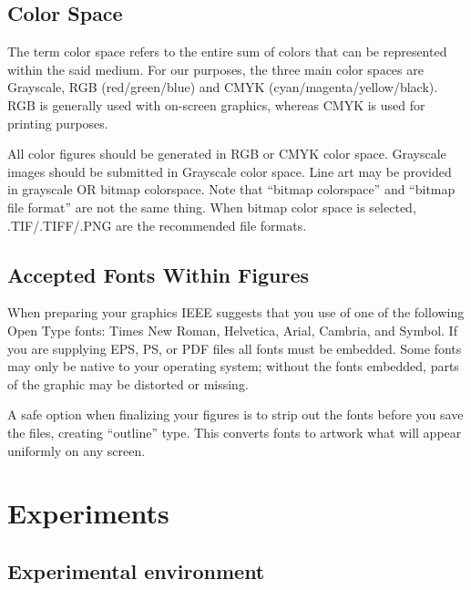 \documentclass{ieeeaccess}
\begin{document}
\subsection{Color Space}
The term color space refers to the entire sum of colors that can be 
represented within the said medium. For our purposes, the three main color 
spaces are Grayscale, RGB (red/green/blue) and CMYK 
(cyan/magenta/yellow/black). RGB is generally used with on-screen graphics, 
whereas CMYK is used for printing purposes.

All color figures should be generated in RGB or CMYK color space. Grayscale 
images should be submitted in Grayscale color space. Line art may be 
provided in grayscale OR bitmap colorspace. Note that ``bitmap colorspace'' 
and ``bitmap file format'' are not the same thing. When bitmap color space 
is selected, .TIF/.TIFF/.PNG are the recommended file formats.

\subsection{Accepted Fonts Within Figures}
When preparing your graphics IEEE suggests that you use of one of the 
following Open Type fonts: Times New Roman, Helvetica, Arial, Cambria, and 
Symbol. If you are supplying EPS, PS, or PDF files all fonts must be 
embedded. Some fonts may only be native to your operating system; without 
the fonts embedded, parts of the graphic may be distorted or missing.

A safe option when finalizing your figures is to strip out the fonts before 
you save the files, creating ``outline'' type. This converts fonts to 
artwork what will appear uniformly on any screen.

\section{Experiments}

\subsection{Experimental environment} 
\end{document}
